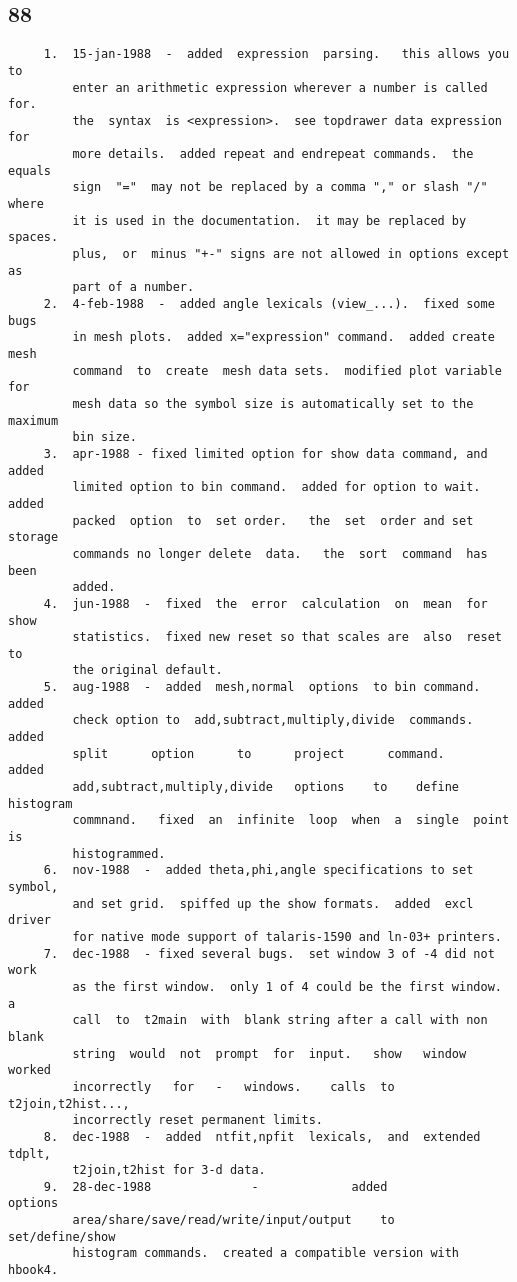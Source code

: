 \subsection{88}
\begin{verbatim}
     1.  15-jan-1988  -  added  expression  parsing.   this allows you to
         enter an arithmetic expression wherever a number is called  for.
         the  syntax  is <expression>.  see topdrawer data expression for
         more details.  added repeat and endrepeat commands.  the  equals
         sign  "="  may not be replaced by a comma "," or slash "/" where
         it is used in the documentation.  it may be replaced by  spaces.
         plus,  or  minus "+-" signs are not allowed in options except as
         part of a number.  
     2.  4-feb-1988  -  added angle lexicals (view_...).  fixed some bugs
         in mesh plots.  added x="expression" command.  added create mesh
         command  to  create  mesh data sets.  modified plot variable for
         mesh data so the symbol size is automatically set to the maximum
         bin size.  
     3.  apr-1988 - fixed limited option for show data command, and added
         limited option to bin command.  added for option to wait.  added
         packed  option  to  set order.   the  set  order and set storage
         commands no longer delete  data.   the  sort  command  has  been
         added.  
     4.  jun-1988  -  fixed  the  error  calculation  on  mean  for  show
         statistics.  fixed new reset so that scales are  also  reset  to
         the original default.  
     5.  aug-1988  -  added  mesh,normal  options  to bin command.  added
         check option to  add,subtract,multiply,divide  commands.   added
         split      option      to      project      command.       added
         add,subtract,multiply,divide   options    to    define histogram
         commnand.   fixed  an  infinite  loop  when  a  single  point is
         histogrammed.  
     6.  nov-1988  -  added theta,phi,angle specifications to set symbol,
         and set grid.  spiffed up the show formats.  added  excl  driver
         for native mode support of talaris-1590 and ln-03+ printers.  
     7.  dec-1988  - fixed several bugs.  set window 3 of -4 did not work
         as the first window.  only 1 of 4 could be the first window.   a
         call  to  t2main  with  blank string after a call with non blank
         string  would  not  prompt  for  input.   show   window   worked
         incorrectly   for   -   windows.    calls  to  t2join,t2hist...,
         incorrectly reset permanent limits.  
     8.  dec-1988  -  added  ntfit,npfit  lexicals,  and  extended tdplt,
         t2join,t2hist for 3-d data.  
     9.  28-dec-1988              -             added             options
         area/share/save/read/write/input/output    to    set/define/show
         histogram commands.  created a compatible version with hbook4.  
\end{verbatim}

